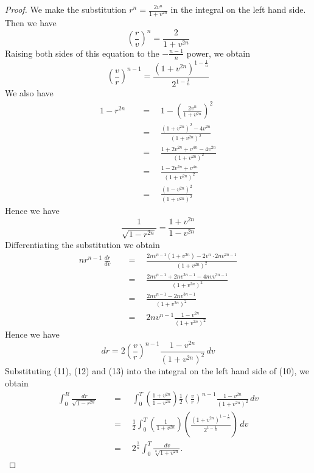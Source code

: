 \documentclass{amsart}
\theoremstyle{definition}
\begin{document}
\begin{proof}
We make the substitution $r^n=\frac{2v^n}{1+v^{2n}}$ in the integral on the left hand side. Then we have
\[\left(\frac{r}{v}\right)^n = \frac{2}{1+v^{2n}}\]
Raising both sides of this equation to the $-\frac{n-1}{n}$ power, we obtain
\begin{equation}
\left(\frac{v}{r}\right)^{n-1}=\frac{(1+v^{2n})^{1-\frac{1}{n}}}{2^{1-\frac{1}{n}}}
\end{equation}
We also have
\begin{align*}
1-r^{2n} &\quad=\quad 1-\left(\frac{2v^n}{1+v^{2n}}\right)^2\\
&\quad=\quad\frac{(1+v^{2n})^2-4v^{2n}}{(1+v^{2n})^2}\\
&\quad=\quad\frac{1+2v^{2n}+v^{4n}-4v^{2n}}{(1+v^{2n})^2}\\
&\quad=\quad\frac{1-2v^{2n}+v^{4n}}{(1+v^{2n})^2}\\
&\quad=\quad\frac{(1-v^{2n})^2}{(1+v^{2n})^2}
\end{align*}
Hence we have
\begin{equation}
\frac{1}{\sqrt{1-r^{2n}}}=\frac{1+v^{2n}}{1-v^{2n}}
\end{equation}
Differentiating the substitution we obtain
\begin{align*}
nr^{n-1}\,\frac{dr}{dv} &\quad=\quad\frac{2nv^{n-1}(1+v^{2n})-2v^n\cdot2nv^{2n-1}}{(1+v^{2n})^2}\\
&\quad=\quad\frac{2nv^{n-1}+2nv^{3n-1}-4nvv^{3n-1}}{(1+v^{2n})^2}\\
&\quad=\quad\frac{2nv^{n-1}-2nv^{3n-1}}{(1+v^{2n})^2}\\
&\quad=\quad 2nv^{n-1}\frac{1-v^{2n}}{(1+v^{2n})^2}
\end{align*}
Hence we have
\begin{equation}
dr= 2\left(\frac{v}{r}\right)^{n-1}\frac{1-v^{2n}}{(1+v^{2n})^2}\,dv
\end{equation}
Substituting (11), (12) and (13) into the integral on the left hand side of (10), we obtain
\begin{align*}
\int_0^R\frac{\,dr}{\sqrt{1-r^{2n}}} &\quad=\quad\int_0^T\left(\frac{1+v^{2n}}{1-v^{2n}}\right)\frac{1}{2}\left(\frac{v}{r}\right)^{n-1}\frac{1-v^{2n}}{(1+v^{2n})^2}\,dv\\
&\quad=\quad\frac{1}{2}\int_0^T\left(\frac{1}{1+v^{2n}}\right)\left(\frac{(1+v^{2n})^{1-\frac{1}{n}}}{2^{1-\frac{1}{n}}}\right)\,dv\\
&\quad=\quad 2^{\frac{1}{n}}\int_0^T\frac{\,dv}{\sqrt[n]{1+v^{2n}}}.
\end{align*}
\end{proof}
\bigskip
\end{document}
